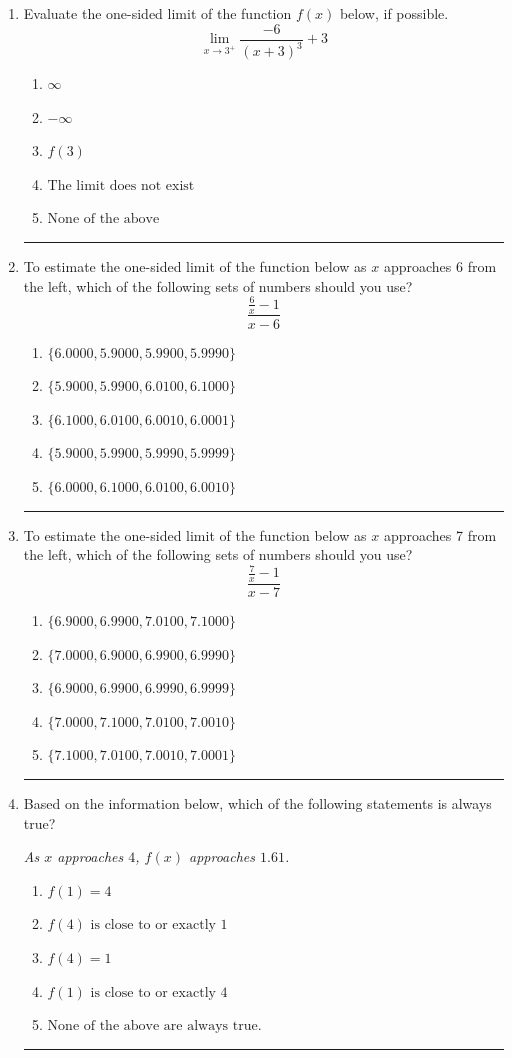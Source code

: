 \documentclass[14pt]{extbook}
\newcommand{\litem}[1]{\item#1\hspace*{-1cm}\rule{\textwidth}{0.4pt}}
\begin{document}
\begin{enumerate}
{\begin{enumerate}[label=\Alph*.]
\end{enumerate} }
\litem{
Evaluate the one-sided limit of the function $f(x)$ below, if possible.\[ \lim_{x \rightarrow 3^+} \frac{-6}{(x+3)^3}+3 \]\begin{enumerate}[label=\Alph*.]
\item \( \infty \)
\item \( -\infty \)
\item \( f(3) \)
\item \( \text{The limit does not exist} \)
\item \( \text{None of the above} \)

\end{enumerate} }
\litem{
To estimate the one-sided limit of the function below as $x$ approaches 6 from the left, which of the following sets of numbers should you use?\[ \frac{\frac{6}{x} - 1}{x - 6} \]\begin{enumerate}[label=\Alph*.]
\item \( \{ 6.0000, 5.9000, 5.9900, 5.9990 \} \)
\item \( \{ 5.9000, 5.9900, 6.0100, 6.1000 \} \)
\item \( \{ 6.1000, 6.0100, 6.0010, 6.0001 \} \)
\item \( \{ 5.9000, 5.9900, 5.9990, 5.9999 \} \)
\item \( \{ 6.0000, 6.1000, 6.0100, 6.0010 \} \)

\end{enumerate} }
\litem{
To estimate the one-sided limit of the function below as $x$ approaches 7 from the left, which of the following sets of numbers should you use?\[ \frac{\frac{7}{x} - 1}{x - 7} \]\begin{enumerate}[label=\Alph*.]
\item \( \{ 6.9000, 6.9900, 7.0100, 7.1000 \} \)
\item \( \{ 7.0000, 6.9000, 6.9900, 6.9990 \} \)
\item \( \{ 6.9000, 6.9900, 6.9990, 6.9999 \} \)
\item \( \{ 7.0000, 7.1000, 7.0100, 7.0010 \} \)
\item \( \{ 7.1000, 7.0100, 7.0010, 7.0001 \} \)

\end{enumerate} }
\litem{
Based on the information below, which of the following statements is always true?
\begin{center}
    \textit{ As $x$ approaches $4$, $f(x)$ approaches $1.61$. }
\end{center}
\begin{enumerate}[label=\Alph*.]
\item \( f(1) = 4 \)
\item \( f(4) \text{ is close to or exactly } 1 \)
\item \( f(4) = 1 \)
\item \( f(1) \text{ is close to or exactly } 4 \)
\item \( \text{None of the above are always true.} \)

\end{enumerate} }
\end{enumerate}
\end{document}
